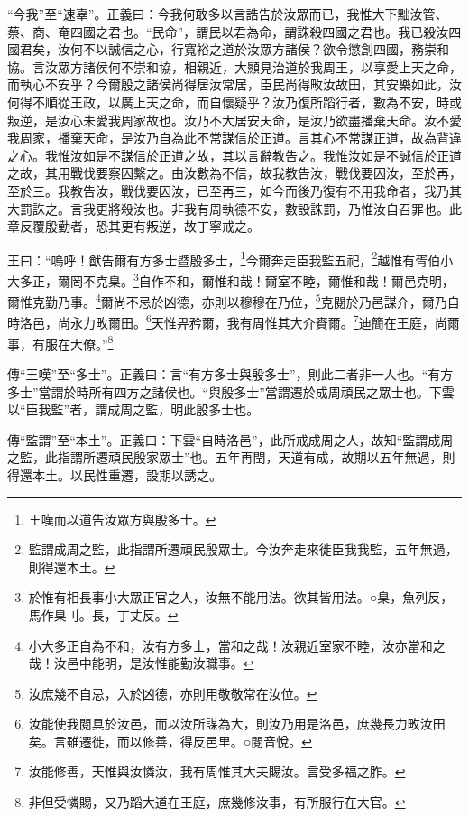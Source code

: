 {\noindent\shu{}\fzkt “今我”至“速辜”。正義曰：今我何敢多以言誥告於汝眾而已，我惟大下黜汝管、蔡、商、奄四國之君也。“民命”，謂民以君為命，謂誅殺四國之君也。我已殺汝四國君矣，汝何不以誠信之心，行寬裕之道於汝眾方諸侯？欲令懲創四國，務崇和協。言汝眾方諸侯何不崇和協，相親近，大顯見治道於我周王，以享愛上天之命，而執心不安乎？今爾殷之諸侯尚得居汝常居，臣民尚得畋汝故田，其安樂如此，汝何得不順從王政，以廣上天之命，而自懷疑乎？汝乃復所蹈行者，數為不安，時或叛逆，是汝心未愛我周家故也。汝乃不大居安天命，是汝乃欲盡播棄天命。汝不愛我周家，播棄天命，是汝乃自為此不常謀信於正道。言其心不常謀正道，故為背違之心。我惟汝如是不謀信於正道之故，其以言辭教告之。我惟汝如是不誠信於正道之故，其用戰伐要察囚繫之。由汝數為不信，故我教告汝，戰伐要囚汝，至於再，至於三。我教告汝，戰伐要囚汝，已至再三，如今而後乃復有不用我命者，我乃其大罰誅之。言我更將殺汝也。非我有周執德不安，數設誅罰，乃惟汝自召罪也。此章反覆殷勤者，恐其更有叛逆，故丁寧戒之。 \par}

王曰：“嗚呼！猷告爾有方多士暨殷多士，\footnote{王嘆而以道告汝眾方與殷多士。}今爾奔走臣我監五祀，\footnote{監謂成周之監，此指謂所遷頑民殷眾士。今汝奔走來徙臣我我監，五年無過，則得還本土。}越惟有胥伯小大多正，爾罔不克臬。\footnote{於惟有相長事小大眾正官之人，汝無不能用法。欲其皆用法。○臬，魚列反，馬作臬刂。長，丁丈反。}自作不和，爾惟和哉！爾室不睦，爾惟和哉！爾邑克明，爾惟克勤乃事。\footnote{小大多正自為不和，汝有方多士，當和之哉！汝親近室家不睦，汝亦當和之哉！汝邑中能明，是汝惟能勤汝職事。}爾尚不忌於凶德，亦則以穆穆在乃位，\footnote{汝庶幾不自忌，入於凶德，亦則用敬敬常在汝位。}克閱於乃邑謀介，爾乃自時洛邑，尚永力畋爾田。\footnote{汝能使我閱具於汝邑，而以汝所謀為大，則汝乃用是洛邑，庶幾長力畋汝田矣。言雖遷徙，而以修善，得反邑里。○閱音悅。}天惟畀矜爾，我有周惟其大介賚爾。\footnote{汝能修善，天惟與汝憐汝，我有周惟其大夫賜汝。言受多福之胙。}迪簡在王庭，尚爾事，有服在大僚。”\footnote{非但受憐賜，又乃蹈大道在王庭，庶幾修汝事，有所服行在大官。}


{\noindent\zhuan{}\fzbyks 傳“王嘆”至“多士”。正義曰：言“有方多士與殷多士”，則此二者非一人也。“有方多士”當謂於時所有四方之諸侯也。“與殷多士”當謂遷於成周頑民之眾士也。下雲以“臣我監”者，謂成周之監，明此殷多士也。 \par}

{\noindent\zhuan{}\fzbyks 傳“監謂”至“本土”。正義曰：下雲“自時洛邑”，此所戒成周之人，故知“監謂成周之監，此指謂所遷頑民殷家眾士”也。五年再閏，天道有成，故期以五年無過，則得還本土。以民性重遷，設期以誘之。 \par}

